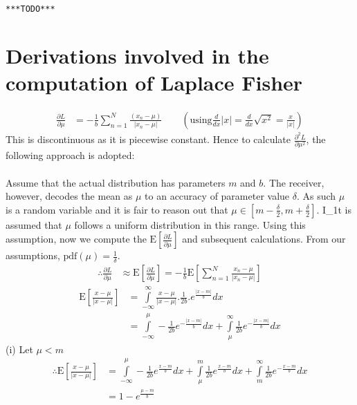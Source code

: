 \documentclass[wcp]{jmlr}
\begin{document}
\texttt{***TODO***}




\appendix
\section{Derivations involved in the computation of Laplace Fisher}
\label{apd:laplace_fisher}
\begin{align*}
 \frac{\partial L}{\partial \mu} &= -\frac{1}{b} \sum_{n=1}^N \frac{(x_n-\mu)}{|x_n-\mu|} \quad\quad\left(\mathrm{using} \frac{d}{dx}|x| = \frac{d}{dx}\sqrt{x^2} = \frac{x}{|x|}\right)
\end{align*}
This is discontinuous as it is piecewise constant. Hence to calculate $\frac{\partial^2 L}{\partial \mu^2}$, the following approach is adopted: \\\\
Assume that the actual distribution has parameters $m$ and 
$b$. The receiver, however, decodes the mean as $\mu$ to an accuracy of parameter
value $\delta$. As such $\mu$ is a random variable and it is fair to reason out
that $\mu \in \left[m-\frac{\delta}{2},m+\frac{\delta}{2}\right]$. I_1t is 
assumed that $\mu$ follows a uniform distribution in this range. Using this 
assumption, now we compute the $\mathrm{E}\left[\frac{\partial L}{\partial \mu}\right]$ 
and subsequent calculations. From our assumptions, $\mathrm{pdf}(\mu) = \frac{1}{\delta}$.
\begin{align*}
 \therefore \frac{\partial L}{\partial \mu} &\approx \mathrm{E}\left[\frac{\partial L}{\partial \mu}\right] = -\frac{1}{b}\mathrm{E}\left[\sum_{n=1}^{N}\frac{x_n-\mu}{|x_n-\mu|}\right]
\end{align*}
\begin{align*}
 \mathrm{E}\left[\frac{x-\mu}{|x-\mu|}\right] &= \int\limits_{-\infty}^{\infty} \frac{x-\mu}{|x-\mu|}.\frac{1}{2b}.e^{\frac{|x-m|}{b}} dx \\
 &= \int\limits_{-\infty}^{\mu} -\frac{1}{2b} e^{-\frac{|x-m|}{b}} dx + \int\limits_{\mu}^{\infty} \frac{1}{2b} e^{-\frac{|x-m|}{b}} dx
\end{align*}
(i) Let $\mu < m$
\begin{align*}
 \therefore \mathrm{E}\left[\frac{x-\mu}{|x-\mu|}\right] &= \int\limits_{-\infty}^{\mu} -\frac{1}{2b} e^{\frac{x-m}{b}} dx + \int\limits_{\mu}^{m} \frac{1}{2b} e^{\frac{x-m}{b}} dx + \int\limits_{m}^{\infty} \frac{1}{2b} e^{-\frac{x-m}{b}} dx \\
 &= 1 - e^{\frac{\mu-m}{b}}
\end{align*}
\end{document}
